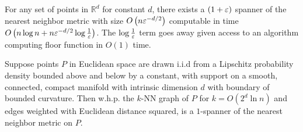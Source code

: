 
\begin{theorem} \label{thm:general-spanner}
  For any set of points in $\mathbb{R}^d$ for constant $d$, there exists a $(1+\varepsilon)$
  spanner of the nearest neighbor metric
  with size $O\left(n\varepsilon^{-d/2} \right)$ computable in time
  $O\left(n \log n + n\varepsilon^{-d/2}\log{\frac{1}{\varepsilon}}\right)$. The
  $\log{\frac{1}{\varepsilon}}$ term goes away given access to an algorithm
computing floor function
in $O(1)$ time.
\end{theorem}

\begin{theorem} \label{thm:distribution-spanner}
Suppose points $P$ in Euclidean space are drawn i.i.d from a Lipschitz probability density bounded
above and below by a constant, with support on a
smooth, connected, compact manifold with intrinsic dimension $d$ with boundary of bounded curvature. Then w.h.p. the $k$-NN graph of
  $P$ for $k = O(2^d \ln n)$ and edges weighted with Euclidean
  distance squared, is a $1$-spanner of the nearest neighbor
  metric on $P$.
\end{theorem}
